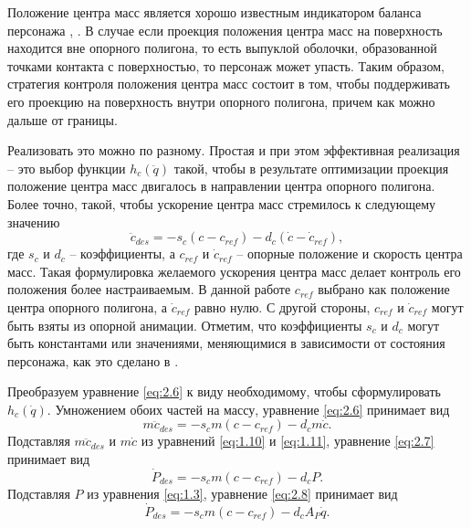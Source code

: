Положение центра масс является хорошо известным индикатором баланса персонажа \cite{AbeSP}, \cite{MacchiettoZS}. В случае если проекция положения центра масс на поверхность находится вне опорного полигона, то есть выпуклой оболочки, образованной точками контакта с поверхностью, то персонаж может упасть. Таким образом, стратегия контроля положения центра масс состоит в том, чтобы поддерживать его проекцию на поверхность внутри опорного полигона, причем как можно дальше от границы.

Реализовать это можно по разному. Простая и при этом эффективная реализация -- это выбор функции $h_c(\ddot{q})$ такой, чтобы в результате оптимизации проекция положение центра масс двигалось в направлении центра опорного полигона. Более точно, такой, чтобы ускорение центра масс стремилось к следующему значению
\begin{equation*}
  \ddot{c}_{des} = - s_{c} (c - c_{ref}) - d_{c} (\dot{c} - \dot{c}_{ref}), \tag{2.6}\label{eq:2.6}
\end{equation*}
где $s_{c}$ и $d_{c}$ -- коэффициенты, а $c_{ref}$ и $\dot{c}_{ref}$ -- опорные положение и скорость центра масс. Такая формулировка желаемого ускорения центра масс делает контроль его положения более настраиваемым. В данной работе $c_{ref}$ выбрано как положение центра опорного полигона, а $\dot{c}_{ref}$ равно нулю. С другой стороны, $c_{ref}$ и $\dot{c}_{ref}$ могут быть взяты из опорной анимации. Отметим, что коэффициенты $s_{c}$ и $d_{c}$ могут быть константами или значениями, меняющимися в зависимости от состояния персонажа, как это сделано в \cite{AbeSP}.


Преобразуем уравнение \ref{eq:2.6} к виду необходимому, чтобы сформулировать $h_c(\dot{q})$. Умножением обоих частей на массу, уравнение \ref{eq:2.6} принимает вид
\begin{equation*}
  m \ddot{c}_{des} = - s_{c} m (c - c_{ref}) - d_{c} m \dot{c}. \tag{2.7}\label{eq:2.7}
\end{equation*}
Подставляя $m \ddot{c}_{des}$ и $m \dot{c}$ из уравнений \ref{eq:1.10} и \ref{eq:1.11}, уравнение \ref{eq:2.7} принимает вид
\begin{equation*}
  \dot{P}_{des} = - s_{c} m (c - c_{ref}) - d_{c} P. \tag{2.8}\label{eq:2.8}
\end{equation*}
Подставляя $P$ из уравнения \ref{eq:1.3}, уравнение \ref{eq:2.8} принимает вид
\begin{equation*}
  \dot{P}_{des} = - s_{c} m (c - c_{ref}) - d_{c} A_{P} \dot{q}. \tag{2.9}\label{eq:2.9}
\end{equation*}

